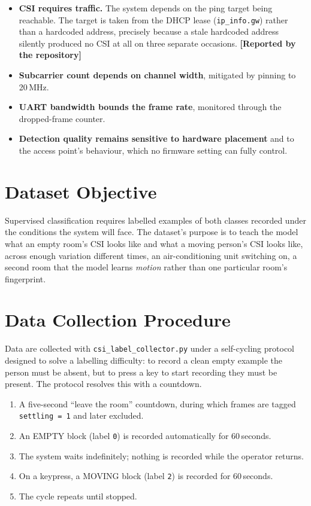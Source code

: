 \documentclass[11pt,a4paper,oneside]{report}
\newcommand{\evidencetag}[2]{{\small\sffamily\bfseries\textcolor{#1}{[#2]}}}
\newcommand{\Repo}{\evidencetag{neutralgrey}{Reported by the repository}}
\newcommand{\code}[1]{\texttt{\small #1}}
\begin{document}
\begin{itemize}[leftmargin=1.4em, itemsep=3pt]
  \item \textbf{CSI requires traffic.} The system depends on the ping target
        being reachable. The target is taken from the DHCP lease
        (\code{ip\_info.gw}) rather than a hardcoded address, precisely because
        a stale hardcoded address silently produced no CSI at all on three
        separate occasions. \Repo
  \item \textbf{Subcarrier count depends on channel width}, mitigated by
        pinning to 20\,MHz.
  \item \textbf{UART bandwidth bounds the frame rate}, monitored through the
        dropped-frame counter.
  \item \textbf{Detection quality remains sensitive to hardware placement} and
        to the access point's behaviour, which no firmware setting can fully
        control.
\end{itemize}

\label{ch:data}

\section{Dataset Objective}

Supervised classification requires labelled examples of both classes recorded
under the conditions the system will face. The dataset's purpose is to teach
the model what an empty room's CSI looks like and what a moving person's CSI
looks like, across enough variation different times, an air-conditioning
unit switching on, a second room that the model learns \emph{motion} rather
than one particular room's fingerprint.

\section{Data Collection Procedure}

Data are collected with \code{csi\_label\_collector.py} under a self-cycling
protocol designed to solve a labelling difficulty: to record a clean empty
example the person must be absent, but to press a key to start recording they
must be present. The protocol resolves this with a countdown.

\begin{enumerate}[leftmargin=1.6em, itemsep=2pt]
  \item A five-second ``leave the room'' countdown, during which frames are
        tagged \code{settling = 1} and later excluded.
  \item An EMPTY block (label \code{0}) is recorded automatically for
        60\,seconds.
  \item The system waits indefinitely; nothing is recorded while the operator
        returns.
  \item On a keypress, a MOVING block (label \code{2}) is recorded for
        60\,seconds.
  \item The cycle repeats until stopped.
\end{enumerate}
\end{document}
